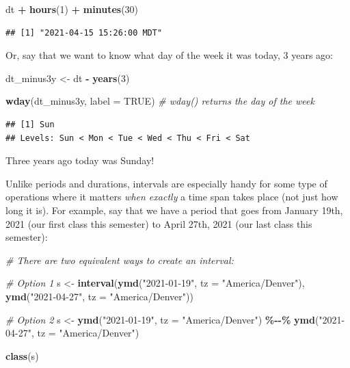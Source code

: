 \documentclass[
]{book}
\newenvironment{Shaded}{\begin{snugshade}}{\end{snugshade}}
\newcommand{\AttributeTok}[1]{\textcolor[rgb]{0.13,0.29,0.53}{#1}}
\newcommand{\CommentTok}[1]{\textcolor[rgb]{0.56,0.35,0.01}{\textit{#1}}}
\newcommand{\ConstantTok}[1]{\textcolor[rgb]{0.56,0.35,0.01}{#1}}
\newcommand{\DecValTok}[1]{\textcolor[rgb]{0.00,0.00,0.81}{#1}}
\newcommand{\FunctionTok}[1]{\textcolor[rgb]{0.13,0.29,0.53}{\textbf{#1}}}
\newcommand{\NormalTok}[1]{#1}
\newcommand{\OtherTok}[1]{\textcolor[rgb]{0.56,0.35,0.01}{#1}}
\newcommand{\SpecialCharTok}[1]{\textcolor[rgb]{0.81,0.36,0.00}{\textbf{#1}}}
\newcommand{\StringTok}[1]{\textcolor[rgb]{0.31,0.60,0.02}{#1}}
\begin{document}
\begin{Shaded}
\begin{Highlighting}[]
\NormalTok{dt }\SpecialCharTok{+} \FunctionTok{hours}\NormalTok{(}\DecValTok{1}\NormalTok{) }\SpecialCharTok{+} \FunctionTok{minutes}\NormalTok{(}\DecValTok{30}\NormalTok{)}
\end{Highlighting}
\end{Shaded}

\begin{verbatim}
## [1] "2021-04-15 15:26:00 MDT"
\end{verbatim}

Or, say that we want to know what day of the week it was today, 3 years ago:

\begin{Shaded}
\begin{Highlighting}[]
\NormalTok{dt\_minus3y }\OtherTok{\textless{}{-}}\NormalTok{ dt }\SpecialCharTok{{-}} \FunctionTok{years}\NormalTok{(}\DecValTok{3}\NormalTok{)}

\FunctionTok{wday}\NormalTok{(dt\_minus3y, }\AttributeTok{label =} \ConstantTok{TRUE}\NormalTok{) }\CommentTok{\# wday() returns the day of the week}
\end{Highlighting}
\end{Shaded}

\begin{verbatim}
## [1] Sun
## Levels: Sun < Mon < Tue < Wed < Thu < Fri < Sat
\end{verbatim}

Three years ago today was Sunday!

Unlike periods and durations, intervals are especially handy for some type of operations where it matters \emph{when exactly} a time span takes place (not just how long it is). For example, say that we have a period that goes from January 19th, 2021 (our first class this semester) to April 27th, 2021 (our last class this semester):

\begin{Shaded}
\begin{Highlighting}[]
\CommentTok{\# There are two equivalent ways to create an interval: }

\CommentTok{\# Option 1}
\NormalTok{s }\OtherTok{\textless{}{-}} \FunctionTok{interval}\NormalTok{(}\FunctionTok{ymd}\NormalTok{(}\StringTok{"2021{-}01{-}19"}\NormalTok{, }\AttributeTok{tz =} \StringTok{"America/Denver"}\NormalTok{), }\FunctionTok{ymd}\NormalTok{(}\StringTok{"2021{-}04{-}27"}\NormalTok{, }\AttributeTok{tz =} \StringTok{"America/Denver"}\NormalTok{))}

\CommentTok{\# Option 2}
\NormalTok{s }\OtherTok{\textless{}{-}} \FunctionTok{ymd}\NormalTok{(}\StringTok{"2021{-}01{-}19"}\NormalTok{, }\AttributeTok{tz =} \StringTok{"America/Denver"}\NormalTok{) }\SpecialCharTok{\%{-}{-}\%} \FunctionTok{ymd}\NormalTok{(}\StringTok{"2021{-}04{-}27"}\NormalTok{, }\AttributeTok{tz =} \StringTok{"America/Denver"}\NormalTok{)}

\FunctionTok{class}\NormalTok{(s)}
\end{Highlighting}
\end{Shaded}
\end{document}
